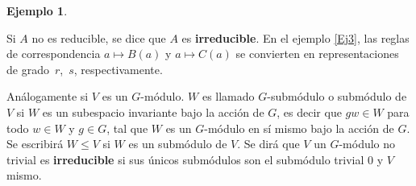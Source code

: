\documentclass[12pt]{book}
\theoremstyle{definition}
\newtheorem{example}[theorem]{Ejemplo}
\newcounter{in}
\begin{document}
\begin{example}
\end{example}

Si $A$ no es reducible, se dice que $A$ es \textbf{irreducible}. En el ejemplo
\ref{Ej3}, las reglas de correspondencia $a \mapsto B\left(a\right)$ y
$a \mapsto C\left(a\right)$ se convierten en representaciones de
grado~$r$,~$s$, respectivamente.

\begin{mdframed}
  Análogamente si $V$ es un $G$-módulo. $W$ es llamado $G$-submódulo o
  submódulo de $V$ si $W$ es un subespacio invariante bajo la acción
  de $G$, es decir que $gw \in W$ para todo $w \in W$ y $g \in G$, tal
  que $W$ es un $G$-módulo en sí mismo bajo la acción de $G$. Se
  escribirá $W \leq V$ si $W$ es un submódulo de $V$. Se dirá que $V$
  un $G$-módulo no trivial es \textbf{irreducible} si sus únicos submódulos son
  el submódulo trivial $0$ y $V$ mismo. 
\end{mdframed}
 
\end{document}
